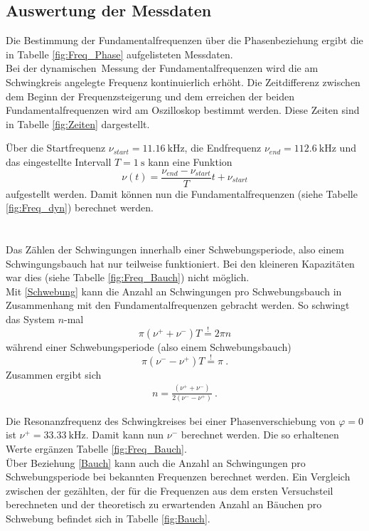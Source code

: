 \subsection{Auswertung der Messdaten}
Die Bestimmung der Fundamentalfrequenzen über die Phasenbeziehung ergibt die in Tabelle \ref{fig:Freq_Phase} aufgelisteten Messdaten.
 \\
Bei der \glqq dynamischen\grqq\ Messung der Fundamentalfrequenzen wird die am Schwingkreis angelegte Frequenz kontinuierlich erhöht. Die Zeitdifferenz zwischen dem Beginn der Frequenzsteigerung und dem erreichen der beiden Fundamentalfrequenzen wird am Oszilloskop bestimmt werden. Diese Zeiten sind in Tabelle \ref{fig:Zeiten} dargestellt.

Über die Startfrequenz $\nu_{start} = \SI{11.16}{\kilo\hertz}$, die Endfrequenz $\nu_{end} = \SI{112.6}{\kilo\hertz}$ und das eingestellte Intervall $T = \SI{1}{\second}$ kann eine Funktion
\[ \nu(t) = \frac{\nu_{end}-\nu_{start}}{T}t+\nu_{start} \]
aufgestellt werden. Damit können nun die Fundamentalfrequenzen (siehe Tabelle \ref{fig:Freq_dyn}) berechnet werden. \\

\ \\
\ \\
Das Zählen der Schwingungen innerhalb einer Schwebungsperiode, also einem Schwingungsbauch hat nur teilweise funktioniert. Bei den kleineren Kapazitäten war dies (siehe Tabelle \ref{fig:Freq_Bauch}) nicht möglich. \\
Mit \eqref{Schwebung} kann die Anzahl an Schwingungen pro Schwebungsbauch in Zusammenhang mit den Fundamentalfrequenzen gebracht werden. So schwingt das System $n$-mal
\[ \pi(\nu^+ + \nu^-)T \overset{!}{=} 2\pi n \]
während einer Schwebungsperiode (also einem Schwebungsbauch)
\[ \pi(\nu^- - \nu^+)T \overset{!}{=} \pi \ . \]
Zusammen ergibt sich
\begin{align}\label{Bauch}
	n = \frac{(\nu^+ + \nu^-)}{2(\nu^- - \nu^+)} \ .
\end{align}

Die Resonanzfrequenz des Schwingkreises bei einer Phasenverschiebung von $\varphi=0$ ist $\nu^+=\SI{33.33}{\kilo\hertz}$. Damit kann nun $\nu^-$ berechnet werden. Die so erhaltenen Werte ergänzen Tabelle \ref{fig:Freq_Bauch}.
 \\
Über Beziehung \eqref{Bauch} kann auch die Anzahl an Schwingungen pro Schwebungsperiode bei bekannten Frequenzen berechnet werden. Ein Vergleich zwischen der gezählten, der für die Frequenzen aus dem ersten Versuchsteil berechneten und der theoretisch zu erwartenden Anzahl an Bäuchen pro Schwebung befindet sich in Tabelle \ref{fig:Bauch}. 

